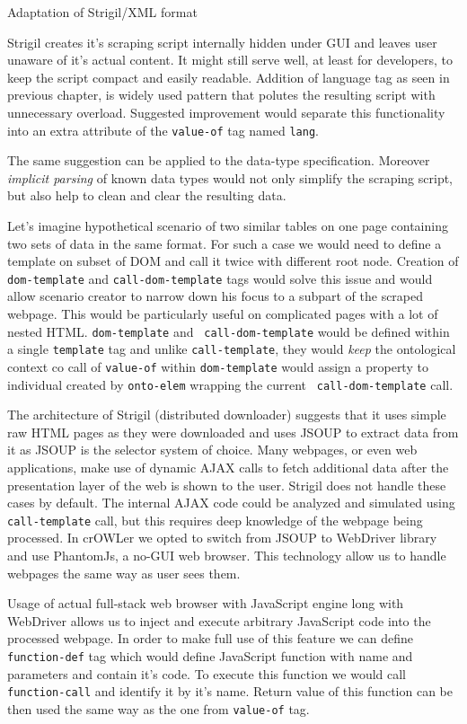 \secc Adaptation of Strigil/XML format

Strigil creates it's scraping script internally hidden under GUI and leaves
user unaware of it's actual content. It might still serve well, at least for
developers, to keep the script compact and easily readable. Addition of
language tag as seen in previous chapter, is widely used pattern that polutes
the resulting script with unnecessary overload. Suggested improvement would
separate this functionality into an extra attribute of the {\tt value-of} tag
named {\tt lang}.

The same suggestion can be applied to the data-type specification. Moreover
{\em implicit parsing} of known data types would not only simplify the scraping
script, but also help to clean and clear the resulting data. 

Let's imagine hypothetical scenario of two similar tables on one page
containing two sets of data in the same format. For such a case we would need
to define a template on subset of DOM and call it twice with different root
node. Creation of {\tt dom-template} and {\tt call-dom-template} tags would
solve this issue and would allow scenario creator to narrow down his focus to a
subpart of the scraped webpage. This would be particularly useful on
complicated pages with a lot of nested HTML. {\tt dom-template} and {\tt
call-dom-template} would be defined within a single {\tt template} tag and
unlike {\tt call-template}, they would {\em keep} the ontological context co
call of {\tt value-of} within {\tt dom-template} would assign a property to
individual created by {\tt onto-elem} wrapping the current {\tt
call-dom-template} call. 

The architecture of Strigil (distributed downloader) suggests that it uses
simple raw HTML pages as they were downloaded and uses JSOUP to extract data
from it as JSOUP is the selector system of choice. Many webpages, or even web
applications, make use of dynamic AJAX calls to fetch additional data after the
presentation layer of the web is shown to the user. Strigil does not handle
these cases by default. The internal AJAX code could be analyzed and simulated
using {\tt call-template} call, but this requires deep knowledge of the webpage
being processed. In crOWLer we opted to switch from JSOUP to WebDriver library
and use PhantomJs, a no-GUI web browser. This technology allow us to handle
webpages the same way as user sees them. 

Usage of actual full-stack web browser with JavaScript engine long with
WebDriver allows us to inject and execute arbitrary JavaScript code into the
processed webpage. In order to make full use of this feature we can define {\tt
function-def} tag which would define JavaScript function with name and
parameters and contain it's code. To execute this function we would call {\tt
function-call} and identify it by it's name. Return value of this function can
be then used the same way as the one from {\tt value-of} tag. 

